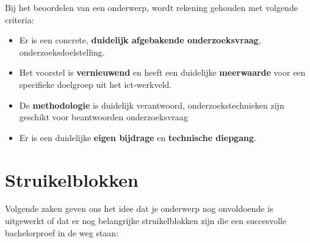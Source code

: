 Bij het beoordelen van een onderwerp, wordt rekening gehouden met volgende criteria:

\begin{itemize}
  \item Er is een concrete, \textbf{duidelijk afgebakende onderzoeksvraag}, onderzoeksdoelstelling.
  \item Het voorstel is \textbf{vernieuwend} en heeft een duidelijke \textbf{meerwaarde} voor een specifieke doelgroep uit het ict-werkveld.
  \item De \textbf{methodologie} is duidelijk verantwoord, onderzoekstechnieken zijn geschikt voor beantwoorden onderzoeksvraag
  \item Er is een duidelijke \textbf{eigen bijdrage} en \textbf{technische diepgang}.
\end{itemize}

\section{Struikelblokken}
\label{sec:onderwerp-struikelblokken}

Volgende zaken geven ons het idee dat je onderwerp nog onvoldoende is uitgewerkt of dat er nog belangrijke struikelblokken zijn die een succesvolle bachelorproef in de weg staan:


